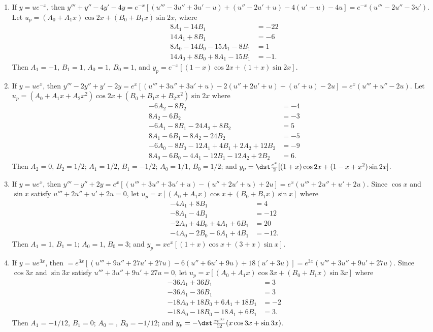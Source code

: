 \documentclass[openany]{book}
\newenvironment{sectionSolutions}{
 \begin{enumerate}[item-label={\thesection.\arabic{enumi}.}]
}{
 \end{enumerate}
}
\begin{document}
\begin{sectionSolutions}
\item
If $y=ue^{-x}$, then
$y'''+y''-4y'-4y=e^{-x}[
(u'''-3u''+3u'-u) +(u''-2u'+u) -4(u'-u) -4u]
=e^{-x}(u'''-2u''-3u')$.
Let $u_p=(A_0+A_1x)\cos2x+(B_0+B_1x)\sin2x$, where
\begin{align*}
8A_1-14B_1&=-22\\
14A_1+8B_1&=-6\\
8A_0-14B_0-15A_1-8B_1&=1\\
14A_0+8B_0+8A_1-15B_1&=-1.
\end{align*}
Then
$A_1=-1$, $B_1=1$, $A_0=1$, $B_0=1$, and
$y_p=e^{-x}\left[(1-x)\cos2x+(1+x)\sin2x\right]$.



\item
If $y=ue^x$, then
$y'''-2y''+y'-2y=e^x[
(u'''+3u''+3u'+u) -2(u''+2u'+u) +(u'+u) -2u]
=e^x(u'''+u''-2u)$.
Let $u_p=(A_0+A_1x+A_2x^2)\cos2x+(B_0+B_1x+B_2x^2)\sin2x$ where
\begin{align*}
-6A_2-8B_2&=-4\\
8A_2-6B_2&=-3\\
-6A_1-8B_1-24A_2+8B_2&=5\\
8A_1-6B_1-8A_2-24B_2&=-5\\
-6A_0-8B_0-12A_1+4B_1+2A_2+12B_2&=-9\\
8A_0-6B_0-4A_1-12B_1-12A_2+2B_2&=6.
\end{align*}
Then $A_2=0$, $B_2=1/2$; $A_1=1/2$, $B_1=-1/2$; $A_0=1/1$, $B_0=1/2$;
and $y_p=\dst\frac{e^x}{2}[(1+x)\cos2x+(1-x+x^2)\sin2x]$.



\item
If $y=ue^x$, then
$y'''-y''+2y=e^x[
(u'''+3u''+3u'+u) -(u''+2u'+u) +2u]
=e^x(u'''+2u''+u'+2u)$.
Since $\cos x$ and $\sin x$ satisfy  $u'''+2u''+u'+2u=0$,
let  $u_p=x[(A_0+A_1x)\cos x+(B_0+B_1x)\sin x]$ where
\begin{align*}
-4A_1+8B_1&=4\\
-8A_1-4B_1&=-12\\
-2A_0+4B_0+4A_1+6B_1&=20\\
-4A_0-2B_0-6A_1+4B_1&=-12.
\end{align*}
Then $A_1=1$, $B_1=1$; $A_0=1$, $B_0=3$; and
 $y_p=xe^x[(1+x)\cos x+(3+x)\sin x]$.


\item
If $y=ue^{3x}$, then
$=e^{3x}[
(u'''+9u''+27u'+27u) -6(u''+6u'+9u) +18(u'+3u)]
=e^{3x}(u'''+3u''+9u'+27u)$.
Since $\cos3x$ and $\sin3x$ satisfy  $u'''+3u''+9u'+27u=0$,
let  $u_p=x[(A_0+A_1x)\cos3x+(B_0+B_1x)\sin3x]$ where
\begin{align*}
-36A_1+36B_1&=3\\
-36A_1-36B_1&=3\\
-18A_0+18B_0+6A_1+18B_1&=-2\\
-18A_0-18B_0-18A_1+6B_1&=3.
\end{align*}
Then  $A_1=-1/12$, $B_1=0$; $A_0=$, $B_0=-1/12$; and
 $y_p=-\dst\frac{xe^{3x}}{12}(x\cos3x+\sin3x)$.



\end{sectionSolutions}
\end{document}

